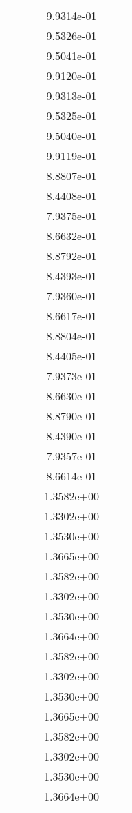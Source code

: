 \begin{xltabular}{\textwidth}{r|rS[table-format=1.3e+2]S[table-format=1.4e+2]S[table-format=1.4e+2]S[table-format=-1.5]}
&  &  & 9.9314e-01 & & \\
&  &  & 9.5326e-01 & & \\
&  &  & 9.5041e-01 & & \\
&  &  & 9.9120e-01 & & \\
&  &  & 9.9313e-01 & & \\
&  &  & 9.5325e-01 & & \\
&  &  & 9.5040e-01 & & \\
&  &  & 9.9119e-01 & & \\
&  &  & 8.8807e-01 & & \\
&  &  & 8.4408e-01 & & \\
&  &  & 7.9375e-01 & & \\
&  &  & 8.6632e-01 & & \\
&  &  & 8.8792e-01 & & \\
&  &  & 8.4393e-01 & & \\
&  &  & 7.9360e-01 & & \\
&  &  & 8.6617e-01 & & \\
&  &  & 8.8804e-01 & & \\
&  &  & 8.4405e-01 & & \\
&  &  & 7.9373e-01 & & \\
&  &  & 8.6630e-01 & & \\
&  &  & 8.8790e-01 & & \\
&  &  & 8.4390e-01 & & \\
&  &  & 7.9357e-01 & & \\
&  &  & 8.6614e-01 & & \\
&  &  & 1.3582e+00 & & \\
&  &  & 1.3302e+00 & & \\
&  &  & 1.3530e+00 & & \\
&  &  & 1.3665e+00 & & \\
&  &  & 1.3582e+00 & & \\
&  &  & 1.3302e+00 & & \\
&  &  & 1.3530e+00 & & \\
&  &  & 1.3664e+00 & & \\
&  &  & 1.3582e+00 & & \\
&  &  & 1.3302e+00 & & \\
&  &  & 1.3530e+00 & & \\
&  &  & 1.3665e+00 & & \\
&  &  & 1.3582e+00 & & \\
&  &  & 1.3302e+00 & & \\
&  &  & 1.3530e+00 & & \\
&  &  & 1.3664e+00 & & \\

\end{xltabular}
